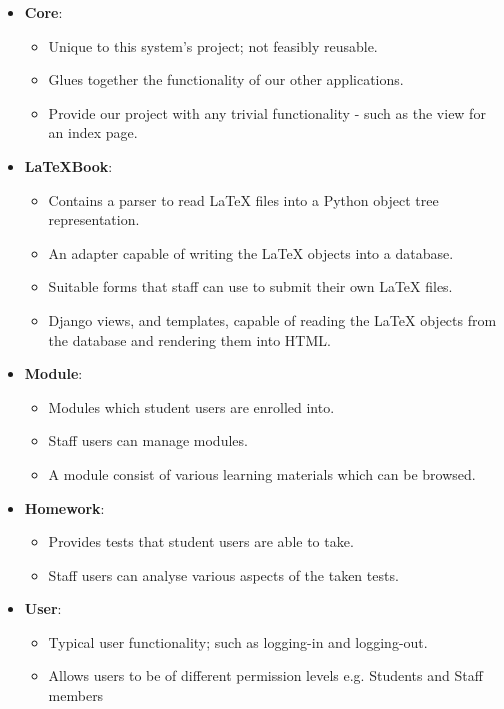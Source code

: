 		\begin{itemize}
			\item \textbf{Core}:
				\begin{itemize}
					\item Unique to this system's project; not feasibly reusable.
					\item Glues together the functionality of our other applications.
					\item Provide our project with any trivial functionality - such as the view for an index page.
				\end{itemize}

			\item \textbf{\LaTeX Book}:
				\begin{itemize}
					\item Contains a parser to read LaTeX files into a Python object tree representation.
					\item An adapter capable of writing the LaTeX objects into a database.
					\item Suitable forms that staff can use to submit their own LaTeX files.
					\item Django views, and templates, capable of reading the LaTeX objects from the database and rendering them into HTML.
				\end{itemize}
				
			\item \textbf{Module}:
				\begin{itemize}
					\item Modules which student users are enrolled into.
					\item Staff users can manage modules.
					\item A module consist of various learning materials which can be browsed.
				\end{itemize} 

			\item \textbf{Homework}:
				\begin{itemize}
					\item Provides tests that student users are able to take.
					\item Staff users can analyse various aspects of the taken tests.
				\end{itemize}
			
			\item \textbf{User}:
			\begin{itemize}
				\item Typical user functionality; such as logging-in and logging-out.
				\item Allows users to be of different permission levels e.g. Students and Staff members
			\end{itemize} 
			
		\end{itemize}

